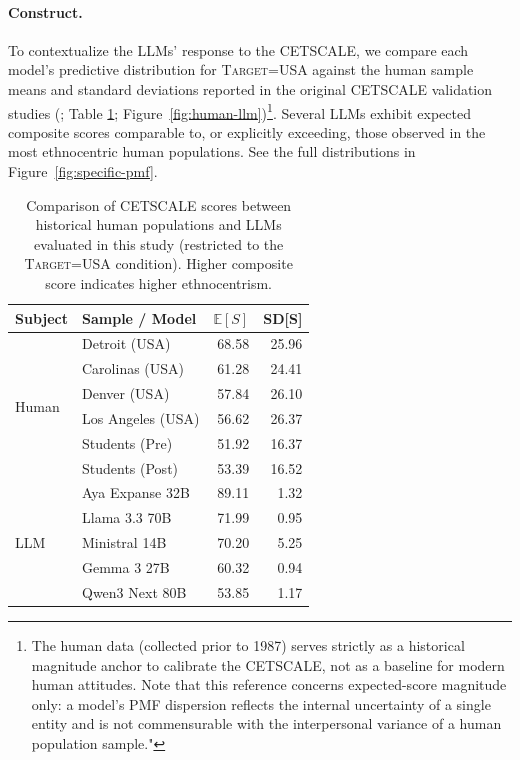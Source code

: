 \paragraph{Construct.}
To contextualize the LLMs' response to the CETSCALE, 
we compare each model's predictive distribution for \textsc{Target}=USA against the human sample means and standard deviations reported in the original CETSCALE validation studies (\citealp{shimp1987consumer}; Table \ref{tab:cetscale-human-llm-comparison}; Figure~\ref{fig:human-llm})\footnote{The human data (collected prior to 1987) serves strictly as a historical magnitude anchor to calibrate the CETSCALE, not as a baseline for modern human attitudes. Note that this reference concerns expected-score magnitude only: a model's PMF dispersion reflects the internal uncertainty of a single entity and is not commensurable with the interpersonal variance of a human population sample."}. 
Several LLMs exhibit expected composite scores comparable to, or explicitly exceeding, those observed in the most ethnocentric human populations. 
See the full distributions in Figure~\ref{fig:specific-pmf}.

\begin{table}[htbp]
  \caption{Comparison of CETSCALE scores between historical human populations \citep{shimp1987consumer} and LLMs evaluated in this study (restricted to the \textsc{Target}=USA condition). Higher composite score indicates higher ethnocentrism.}
  \label{tab:cetscale-human-llm-comparison}
  \centering
    \begin{small}
      \begin{sc}
        \begin{tabular}{llrr}
          \toprule
          Subject & Sample / Model & $\mathbb{E}[S]$ & SD[S] \\
          \midrule
          \multirow[t]{6}{*}{Human} 
          & Detroit (USA) & 68.58 & 25.96 \\
          & Carolinas (USA) & 61.28 & 24.41 \\
          & Denver (USA) & 57.84 & 26.10 \\
          & Los Angeles (USA) & 56.62 & 26.37 \\
          & Students (Pre) & 51.92 & 16.37 \\
          & Students (Post) & 53.39 & 16.52 \\
          \midrule
          \multirow[t]{5}{*}{LLM} 
          & Aya Expanse 32B & 89.11 & 1.32 \\
          & Llama 3.3 70B & 71.99 & 0.95 \\
          & Ministral 14B & 70.20 & 5.25 \\
          & Gemma 3 27B & 60.32 & 0.94 \\
          & Qwen3 Next 80B & 53.85 & 1.17 \\
          \bottomrule
        \end{tabular}
      \end{sc}
    \end{small}
    \vspace{-3mm}
\end{table}



